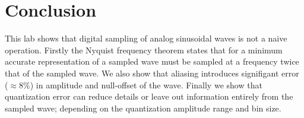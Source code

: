 \documentclass[main.tex]{subfile}
\begin{document}
\section{Conclusion} 
\label{sec:conclusion}

This lab shows that digital sampling of analog sinusoidal waves is not a naive
operation. Firstly the Nyquist frequency theorem states that for a minimum
accurate representation of a sampled wave must be sampled at a frequency twice
that of the sampled wave. We also show that aliasing introduces signifigant
error ($\approx 8\%$) in amplitude and null-offset of the wave. Finally we show
that quantization error can reduce details or leave out information entirely
from the sampled wave; depending on the quantization amplitude range and bin
size.


\end{document}
